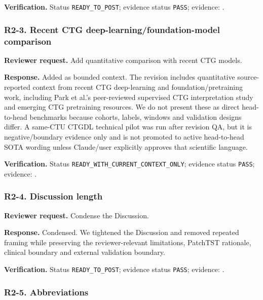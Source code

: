 \documentclass[11pt]{article}
\begin{document}
\textbf{Verification.} Status \texttt{READY\_TO\_POST}; evidence status \texttt{PASS}; evidence: .


\subsubsection*{R2-3. Recent CTG deep-learning/foundation-model comparison}

\textbf{Reviewer request.} Add quantitative comparison with recent CTG models.


\textbf{Response.} Added as bounded context. The revision includes quantitative source-reported context from recent CTG deep-learning and foundation/pretraining work, including Park et al.'s peer-reviewed supervised CTG interpretation study and emerging CTG pretraining resources. We do not present these as direct head-to-head benchmarks because cohorts, labels, windows and validation designs differ. A same-CTU CTGDL technical pilot was run after revision QA, but it is negative/boundary evidence only and is not promoted to active head-to-head SOTA wording unless Claude/user explicitly approves that scientific language.


\textbf{Verification.} Status \texttt{READY\_WITH\_CURRENT\_CONTEXT\_ONLY}; evidence status \texttt{PASS}; evidence: .


\subsubsection*{R2-4. Discussion length}

\textbf{Reviewer request.} Condense the Discussion.


\textbf{Response.} Condensed. We tightened the Discussion and removed repeated framing while preserving the reviewer-relevant limitations, PatchTST rationale, clinical boundary and external validation boundary.


\textbf{Verification.} Status \texttt{READY\_TO\_POST}; evidence status \texttt{PASS}; evidence: .


\subsubsection*{R2-5. Abbreviations}
\end{document}
